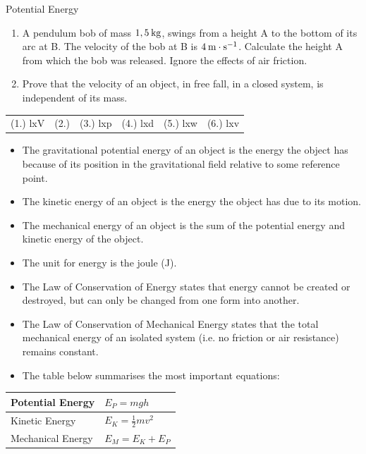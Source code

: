 \begin{exercises}{Potential Energy }
\begin{enumerate}[noitemsep, label=\textbf{\arabic*}. ]
 \item A pendulum bob of mass $1,5\phantom{\rule{2pt}{0ex}}\text{kg}$, swings from a height A to the bottom of its arc at B. The velocity of the bob at B is $4\phantom{\rule{2pt}{0ex}}\text{m}\ensuremath{\cdot}\text{s}{}^{-1}$. Calculate the height A from which the bob was released. Ignore the effects of air friction.\newline
\item Prove that the velocity of an object, in free fall, in a closed system, is independent of its mass.\newline
\end{enumerate}
\par \practiceinfo
 \par \begin{tabular}[h]{cccccc}
 (1.) lxV  & (2.) & (3.) lxp  &  (4.) lxd  &  (5.) lxw  &  (6.) lxv \end{tabular}
\end{exercises}
\clearpage
{}
            \nopagebreak
      \label{m38786*id70947}\begin{itemize}[noitemsep]
\item The gravitational potential energy of an object is the energy the object has because of its position in the gravitational field relative to some reference point.
\item The kinetic energy of an object is the energy the object has due to its motion.
\item The mechanical energy of an object is the sum of the potential energy and kinetic energy of the object.
\item The unit for energy is the joule (J).
\item The Law of Conservation of Energy states that energy cannot be created or destroyed, but can only be changed from one form into another.
\item The Law of Conservation of Mechanical Energy states that the total mechanical energy of an isolated system (i.e. no friction or air resistance) remains constant.
\item The table below summarises the most important equations:
\end{itemize}
          \begin{table}[H]
        \begin{center}
      \label{m38786*id71092}
    \noindent
      \begin{tabular}{|l|l|}\hline
        Potential Energy &
                ${E}_{P}=mgh$
             \\ \hline
        Kinetic Energy &
                ${E}_{K}=\frac{1}{2}m{v}^{2}$
              \\ \hline
        Mechanical Energy &
                ${E}_{M}={E}_{K}+{E}_{P}$
            \\ \hline
    \end{tabular}
      \end{center}
\end{table}
